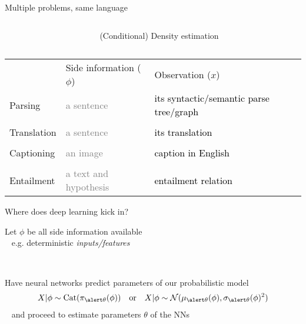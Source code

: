 \documentclass[14pt]{beamer}
\begin{document}
\begin{frame}{Multiple problems, same language}



\begin{small}

\begin{columns}
\begin{column}{0.3\textwidth}
\end{column}
\begin{column}{0.6\textwidth}
\alert{(Conditional) Density estimation}
\end{column}

\end{columns}

\begin{tabular}{p{2cm} p{4cm} p{4cm}}
 & Side information ($\phi$) & Observation ($x$) \\
Parsing &   \textcolor{gray}{a sentence} & \textcolor{black}{its syntactic/semantic parse tree/graph} \\
&&\\
Translation &  \textcolor{gray}{a sentence} & \textcolor{black}{its translation} \\
&&\\
Captioning &  \textcolor{gray}{an image} & \textcolor{black}{caption in English} \\
&&\\
Entailment  & \textcolor{gray}{a text and hypothesis} & \textcolor{black}{entailment relation}
\end{tabular}
\end{small}

\end{frame}

\begin{frame}{Where does deep learning kick in?}

Let $\phi$ be all side information available\\
~ e.g. deterministic \emph{inputs/features}

~

Have neural networks predict parameters of our probabilistic model
	\begin{align*}
    X|\phi \sim \Cat(\pi_{\alert \theta}(\phi)) & & \text{or} & & X|\phi \sim \mathcal N(\mu_{\alert \theta}(\phi), \sigma_{\alert \theta}(\phi)^2)
    \end{align*}
~ and proceed to \alert{estimate parameters} $\theta$ of the NNs %

 





\end{frame}
\end{document}
